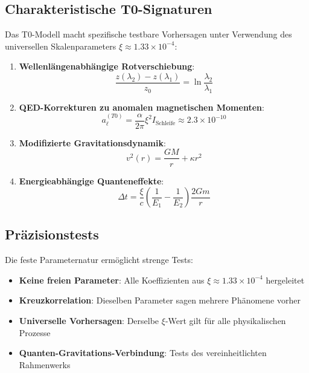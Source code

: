 \documentclass[12pt,a4paper]{article}
\newcommand{\xipar}{\xi}
\theoremstyle{definition}
\theoremstyle{remark}
\begin{document}
	\subsection{Charakteristische T0-Signaturen}
	\label{subsec:charakteristische_signaturen}
	
	Das T0-Modell macht spezifische testbare Vorhersagen unter Verwendung des universellen Skalenparameters $\xi \approx 1.33 \times 10^{-4}$:
	
	\begin{enumerate}
		\item \textbf{Wellenlängenabhängige Rotverschiebung}:
		\begin{equation}
			\frac{z(\lambda_2) - z(\lambda_1)}{z_0} = \ln\frac{\lambda_2}{\lambda_1}
			\label{eq:wellenlaengen_test}
		\end{equation}
		
		\item \textbf{QED-Korrekturen zu anomalen magnetischen Momenten}:
		\begin{equation}
			a_{\ell}^{(T0)} = \frac{\alpha}{2\pi} \xipar^2 I_{\text{Schleife}} \approx 2.3 \times 10^{-10}
			\label{eq:qed_korrektur}
		\end{equation}
		
		\item \textbf{Modifizierte Gravitationsdynamik}:
		\begin{equation}
			v^2(r) = \frac{GM}{r} + \kappa r^2
			\label{eq:rotationskurve_vorhersage}
		\end{equation}
		
		\item \textbf{Energieabhängige Quanteneffekte}:
		\begin{equation}
			\Delta t = \frac{\xipar}{c} \left(\frac{1}{E_1} - \frac{1}{E_2}\right) \frac{2Gm}{r}
			\label{eq:quanten_zeitverzoegerung}
		\end{equation}
	\end{enumerate}
	
	\subsection{Präzisionstests}
	\label{subsec:praezisionstests}
	
	Die feste Parameternatur ermöglicht strenge Tests:
	\begin{itemize}
		\item \textbf{Keine freien Parameter}: Alle Koeffizienten aus $\xipar \approx 1.33 \times 10^{-4}$ hergeleitet
		\item \textbf{Kreuzkorrelation}: Dieselben Parameter sagen mehrere Phänomene vorher
		\item \textbf{Universelle Vorhersagen}: Derselbe $\xipar$-Wert gilt für alle physikalischen Prozesse
		\item \textbf{Quanten-Gravitations-Verbindung}: Tests des vereinheitlichten Rahmenwerks
	\end{itemize}
	
\end{document}
